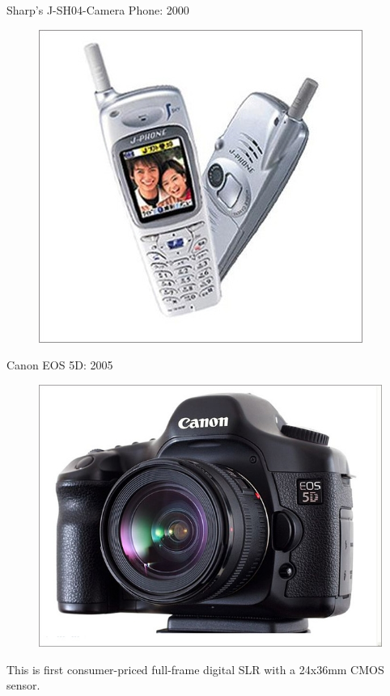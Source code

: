 \documentclass{beamer}
\begin{document}
	\begin{frame}{Sharp’s J-SH04-Camera Phone: 2000}
		\begin{figure}
			\centering
			\includegraphics[scale=0.4]{135.jpg}
		\end{figure}
	\end{frame}
	
	\begin{frame}{Canon EOS 5D: 2005}
		\begin{figure}
			\centering
			\includegraphics[scale=0.4]{136.jpg}
		\end{figure}
		This is first consumer-priced full-frame digital SLR with a 24x36mm CMOS sensor.
	\end{frame}
\end{document}
